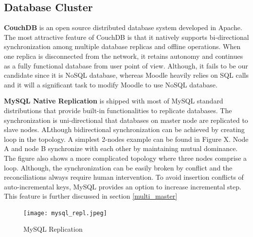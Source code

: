 
\subsection{Database Cluster} \label{db_cluster}
\textbf{CouchDB}\cite{couchdb} is an open source distributed database system developed in Apache. The most attractive feature of CouchDB is that it natively supports bi-directional synchronization among multiple database replicas and offline operations. When one replica is disconnected from the network, it retains autonomy and continues as a fully functional database from user point of view. Although, it fails to be our candidate since it is NoSQL database, whereas Moodle heavily relies on SQL calls and it will a significant task to modify Moodle to use NoSQL database.

\textbf{MySQL Native Replication} is shipped with most of MySQL standard distributions that provide built-in functionalities to replicate databases. The synchronization is uni-directional that databases on master node are replicated to slave nodes. ALthough bidirectional synchronization can be achieved by creating loop in the topology. A simplest 2-nodes example can be found in Figure X. Node A and node B synchronize with each other by maintaining mutual dominance. The figure also shows a more complicated topology where three nodes comprise a loop. Although, the synchronization can be easily broken by conflict and the reconciliations always require human intervention.
To avoid insertion conflicts of auto-incremental keys, MySQL provides an option to increase incremental step. This feature is further discussed in section \ref{multi_master}

\begin{figure}[htbp]
\centering
\texttt{[image: mysql\_repl.jpeg]}
\caption{MySQL Replication}
\label{mysql_repl}
\end{figure}

